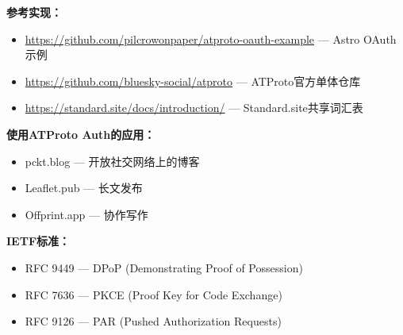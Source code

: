 \documentclass[10pt,letterpaper,twocolumn]{article}
\begin{document}
\textbf{参考实现：}
\begin{itemize}
  \item \url{https://github.com/pilcrowonpaper/atproto-oauth-example} --- Astro OAuth示例
  \item \url{https://github.com/bluesky-social/atproto} --- ATProto官方单体仓库
  \item \url{https://standard.site/docs/introduction/} --- Standard.site共享词汇表
\end{itemize}

\textbf{使用ATProto Auth的应用：}
\begin{itemize}
  \item pckt.blog --- 开放社交网络上的博客
  \item Leaflet.pub --- 长文发布
  \item Offprint.app --- 协作写作
\end{itemize}

\textbf{IETF标准：}
\begin{itemize}
  \item RFC 9449 --- DPoP (Demonstrating Proof of Possession)
  \item RFC 7636 --- PKCE (Proof Key for Code Exchange)
  \item RFC 9126 --- PAR (Pushed Authorization Requests)
\end{itemize}

\vspace{0.5em}



\end{document}
